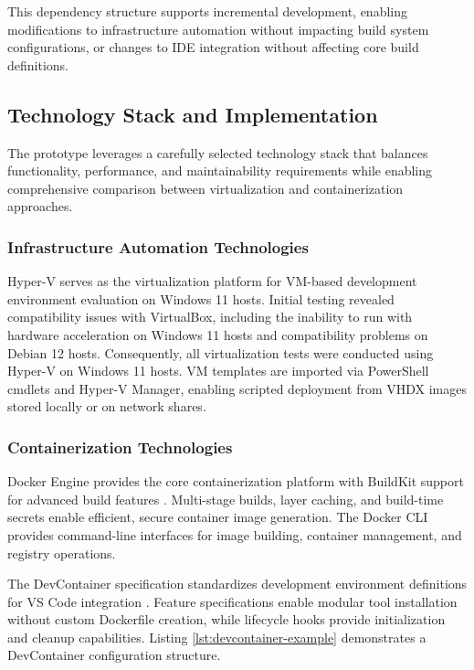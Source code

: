 This dependency structure supports incremental development, enabling modifications to infrastructure automation without impacting build system configurations, or changes to IDE integration without affecting core build definitions.

\subsection{Technology Stack and Implementation}

The prototype leverages a carefully selected technology stack that balances functionality, performance, and maintainability requirements while enabling comprehensive comparison between virtualization and containerization approaches.

\subsubsection{Infrastructure Automation Technologies}

Hyper-V serves as the virtualization platform for VM-based development environment evaluation on Windows 11 hosts.
Initial testing revealed compatibility issues with VirtualBox, including the inability to run with hardware acceleration on Windows 11 hosts and compatibility problems on Debian 12 hosts.
Consequently, all virtualization tests were conducted using Hyper-V on Windows 11 hosts.
VM templates are imported via PowerShell cmdlets and Hyper-V Manager, enabling scripted deployment from VHDX images stored locally or on network shares.

\subsubsection{Containerization Technologies}

Docker Engine provides the core containerization platform with BuildKit support for advanced build features \citep{dockerDockerReferenceDocumentation2025}.
Multi-stage builds, layer caching, and build-time secrets enable efficient, secure container image generation.
The Docker CLI provides command-line interfaces for image building, container management, and registry operations.

The DevContainer specification standardizes development environment definitions for VS Code integration \citep{DevelopmentContainers2025}.
Feature specifications enable modular tool installation without custom Dockerfile creation, while lifecycle hooks provide initialization and cleanup capabilities.
Listing \ref{lst:devcontainer-example} demonstrates a DevContainer configuration structure.

